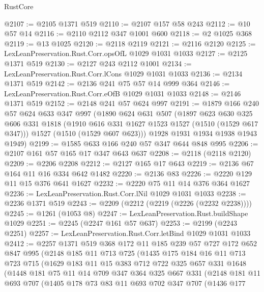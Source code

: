 \begin{lexlean}{RustCore}
\begin{coremodule}
@2107 := @2105 @1371 @519
@2110 := @2107 @157 @58 @243
@2112 := @10 @57 @14
@2116 := @2110 @2112 @347 @1001 @600
@2118 := @2 @1025 @368
@2119 := @13 @1025
@2120 := @2118 @2119
@2121 := @2116 @2120
@2125 := LexLeanPreservation.Rust.Corr.opsOfL @1029 @1031 @1033
@2127 := @2125 @1371 @519
@2130 := @2127 @243 @2112 @1001
@2134 := LexLeanPreservation.Rust.Corr.lCons @1029 @1031 @1033
@2136 := @2134 @1371 @519
@2142 := @2136 @241 @75 @57 @14 @999 @364
@2146 := LexLeanPreservation.Rust.Corr.eOfB @1029 @1031 @1033
@2148 := @2146 @1371 @519
@2152 := @2148 @241 @57 @624 @997
@2191 := @1879
    @166
    @240
    @57
    @624
    @633
    @347
    @997
    (@1890
      @624
      @631
      @507
      (@1897
        @623
        @630
        @325
        @606
        @331
        @1818
        (@1910 @616 @331 @1627 @1523 @1527 (@1510 (@1529 @617 @347)))
        @1527
        (@1510 (@1529 @607 @623)))
      @1928
      @1931
      @1934
      @1938
      @1943
      @1949)
@2199 := @1585 @633 @166 @240 @57 @347 @644 @848 @995
@2206 := @2107 @161 @57 @165 @17 @347 @643 @637
@2208 := @2118 (@2118 @2120)
@2209 := @2206 @2208
@2212 := @2127 @165 @17 @643
@2219 := @2136 @67 @164 @11 @16 @334 @642 @1482
@2220 := @2136 @83
@2226 := @2220 @129 @11 @15 @376 @641 @1627
@2232 := @2220 @75 @11 @14 @376 @364 @1627
@2236 := LexLeanPreservation.Rust.Corr.lNil @1029 @1031 @1033
@2238 := @2236 @1371 @519
@2243 := @2209 (@2212 (@2219 (@2226 (@2232 @2238))))
@2245 := @1261 (@1053 @8)
@2247 := LexLeanPreservation.Rust.buildShape @1029
@2251 := @2245 (@2247 @161 @57 @637)
@2253 := @2199 (@2243 @2251)
@2257 := LexLeanPreservation.Rust.Corr.letBind @1029 @1031 @1033
@2412 := @2257
    @1371
    @519
    @368
    @172
    @11
    @185
    @239
    @57
    @727
    @172
    @652
    @847
    @995
    (@2148
      @185
      @11
      @713
      @725
      (@1435
        @175
        @184
        @16
        @11
        @713
        @723
        @715
        (@1629
          @183
          @11
          @15
          @383
          @712
          @722
          @325
          @657
          @331
          @1648
          (@1448
            @181
            @75
            @11
            @14
            @709
            @347
            @364
            @325
            @667
            @331
            (@2148
              @181
              @11
              @693
              @707
              (@1405
                @178
                @73
                @83
                @11
                @693
                @702
                @347
                @707
                (@1436
                  @177

\end{coremodule}
\end{lexlean}
